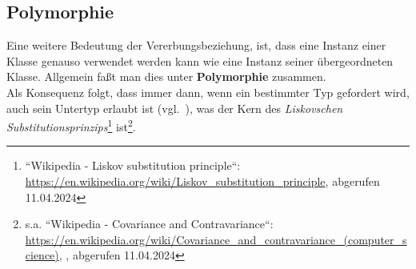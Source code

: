 \subsection*{Polymorphie}
Eine weitere Bedeutung der Vererbungsbeziehung, ist, dass eine Instanz einer Klasse genauso verwendet werden kann wie eine Instanz seiner übergeordneten Klasse. Allgemein faßt man dies unter \textbf{Polymorphie} zusammen.\\
Als Konsequenz folgt, dass immer dann, wenn ein bestimmter Typ gefordert wird, auch sein Untertyp erlaubt ist (vgl.~\cite[466]{Ull23}), was der Kern des \textit{Liskovschen Substitutionsprinzips}\footnote{
    ``Wikipedia - Liskov substitution principle``: \url{https://en.wikipedia.org/wiki/Liskov_substitution_principle}, abgerufen 11.04.2024
} ist\footnote{
    s.a. ``Wikipedia - Covariance and Contravariance``: \url{https://en.wikipedia.org/wiki/Covariance_and_contravariance_(computer_science)}, , abgerufen 11.04.2024
}.\\
